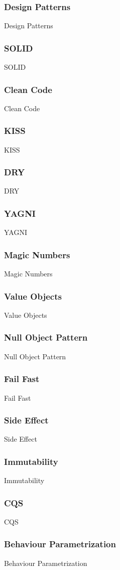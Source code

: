 \subsubsection{Design Patterns}
Design Patterns

\subsubsection{SOLID}
SOLID

\subsubsection{Clean Code}
Clean Code

\subsubsection{KISS}
KISS

\subsubsection{DRY}
DRY

\subsubsection{YAGNI}
YAGNI

\subsubsection{Magic Numbers}
Magic Numbers

\subsubsection{Value Objects}
Value Objects

\subsubsection{Null Object Pattern}
Null Object Pattern

\subsubsection{Fail Fast}
Fail Fast

\subsubsection{Side Effect}
Side Effect

\subsubsection{Immutability}
Immutability

\subsubsection{CQS}
CQS

\subsubsection{Behaviour Parametrization}
Behaviour Parametrization
